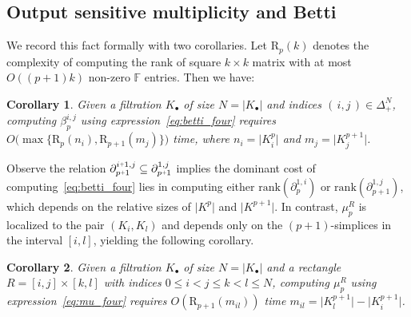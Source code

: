 \documentclass[12pt]{article}
\numberwithin{equation}{section}
\newcommand{\+}{%
	\raisebox{0.18ex}{\scaleobj{0.55}{+}}
}
\newtheorem{corollary}{Corollary}
\theoremstyle{definition}
\begin{document}
\subsection*{Output sensitive multiplicity and Betti}
We record this fact formally with two corollaries. Let $\mathrm{R}_p(k)$ denotes the complexity of computing the rank of square $k \times k$ matrix with at most $O((p+1)k)$ non-zero $\mathbb{F}$ entries. Then we have:
\begin{corollary}
	Given a filtration $K_\bullet$ of size $N = \lvert K_\bullet \rvert$ and indices $(\,i,j\,) \in \Delta_+^N$, computing $\beta_p^{i,j}$ using expression~\eqref{eq:betti_four} requires $O\big(\max \{\mathrm{R}_{p}(n_i), \mathrm{R}_{p+1}(m_j) \} \big)$ time, where $n_i = \lvert K_i^p \rvert$ and $m_j = \lvert K_j^{p+1} \rvert$.
\end{corollary} 
\noindent Observe the relation $\partial_{p\+1}^{i \+ 1, j} \subseteq \partial_{p\+1}^{1, j}$ implies the  dominant cost of computing~\eqref{eq:betti_four} lies in computing either $\mathrm{rank}(\partial_p^{1,i})$ or $\mathrm{rank}(\partial_{p+1}^{1,j})$, which depends on the relative sizes of $\lvert K^p\rvert$ and $\lvert K^{p+1}\rvert$. In contrast, $\mu_p^R$ is localized to the pair $(K_i, K_l)$ and depends only on the $(p+1)$-simplices in the interval $[i, l]$, yielding the following corollary. 
\begin{corollary}
	Given a filtration $K_\bullet$ of size $N = \lvert K_\bullet \rvert$ and a rectangle $R = [i,j] \times [k,l]$ with indices $0 \leq i < j \leq k < l \leq N$, computing $\mu_p^{R}$ using expression~\eqref{eq:mu_four} requires $O(\mathrm{R}_{p+1}(m_{il}))$ time $m_{il} = \lvert K_l^{p+1}\rvert - \lvert K_i^{p+1}\rvert$.
\end{corollary} 
\end{document}
